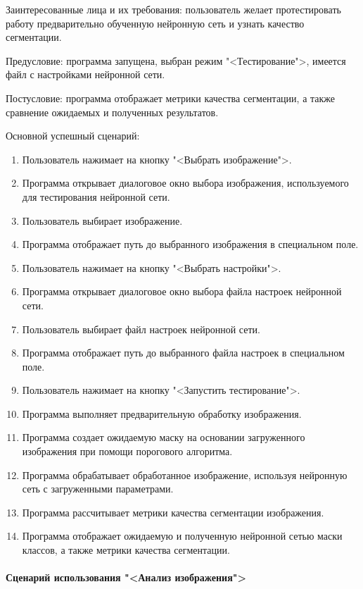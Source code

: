 Заинтересованные лица и их требования: пользователь желает протестировать работу предварительно обученную нейронную сеть и узнать качество сегментации.

Предусловие: программа запущена, выбран режим "<Тестирование">, имеется файл с настройками нейронной сети.

Постусловие: программа отображает метрики качества сегментации, а также сравнение ожидаемых и полученных результатов.

Основной успешный сценарий:

\begin{enumerate}
	\item Пользователь нажимает на кнопку "<Выбрать изображение">.
	\item Программа открывает диалоговое окно выбора изображения, используемого для тестирования нейронной сети.
	\item Пользователь выбирает изображение.
	\item Программа отображает путь до выбранного изображения в специальном поле.
	\item Пользователь нажимает на кнопку "<Выбрать настройки">.
	\item Программа открывает диалоговое окно выбора файла настроек нейронной сети.
	\item Пользователь выбирает файл настроек нейронной сети.
	\item Программа отображает путь до выбранного файла настроек в специальном поле.
	\item Пользователь нажимает на кнопку "<Запустить тестирование">.
	\item Программа выполняет предварительную обработку изображения.
	\item Программа создает ожидаемую маску на основании загруженного изображения при помощи порогового алгоритма.
	\item Программа обрабатывает обработанное изображение, используя нейронную сеть с загруженными параметрами.
	\item Программа рассчитывает метрики качества сегментации изображения.
	\item Программа отображает ожидаемую и полученную нейронной сетью маски классов, а также метрики качества сегментации.
\end{enumerate}

\paragraph{Сценарий использования "<Анализ изображения">}

